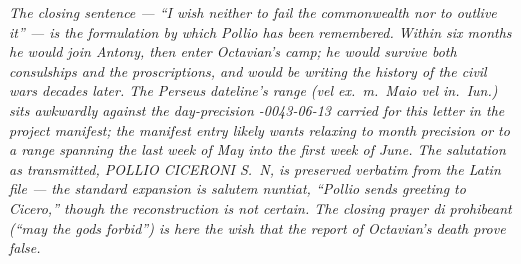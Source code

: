 \textit{The closing sentence --- ``I wish neither to fail
the commonwealth nor to outlive it'' --- is the
formulation by which Pollio has been remembered. Within
six months he would join Antony, then enter Octavian's
camp; he would survive both consulships and the
proscriptions, and would be writing the history of the
civil wars decades later. The Perseus dateline's range
(\textit{vel ex.\ m.\ Maio vel in.\ Iun.}) sits awkwardly
against the day-precision \mbox{-0043-06-13} carried for
this letter in the project manifest; the manifest entry
likely wants relaxing to month precision or to a range
spanning the last week of May into the first week of
June. The salutation as transmitted, \textit{POLLIO
CICERONI S.~N}, is preserved verbatim from the Latin
file --- the standard expansion is \textit{salutem nuntiat},
``Pollio sends greeting to Cicero,'' though the
reconstruction is not certain. The closing prayer
\textit{di prohibeant} (``may the gods forbid'') is here
the wish that the report of Octavian's death prove
false.}

